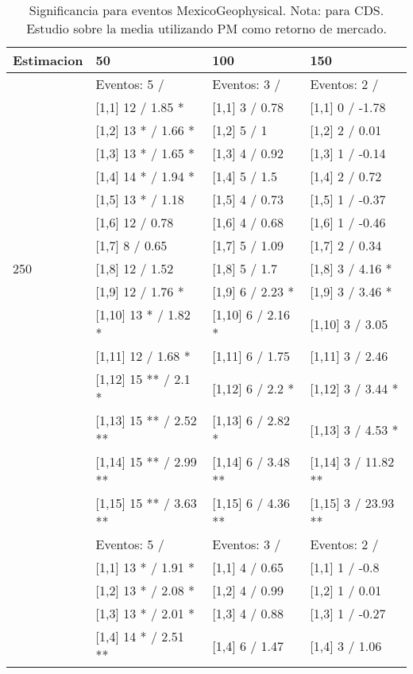 \begin{table}

\caption{Significancia para eventos MexicoGeophysical. Nota: para CDS. Estudio sobre la media utilizando PM como retorno de mercado.}
\centering
\begin{tabular}[t]{llll}
\toprule
Estimacion & 50 & 100 & 150\\
\midrule
 & Eventos:  5 / & Eventos:  3 / & Eventos:  2 /\\
 & {}[1,1] 12  / 1.85 * & {}[1,1] 3  / 0.78 & {}[1,1] 0  / -1.78\\
 & {}[1,2] 13 * / 1.66 * & {}[1,2] 5  / 1 & {}[1,2] 2  / 0.01\\
 & {}[1,3] 13 * / 1.65 * & {}[1,3] 4  / 0.92 & {}[1,3] 1  / -0.14\\
 & {}[1,4] 14 * / 1.94 * & {}[1,4] 5  / 1.5 & {}[1,4] 2  / 0.72\\
\addlinespace
 & {}[1,5] 13 * / 1.18 & {}[1,5] 4  / 0.73 & {}[1,5] 1  / -0.37\\
 & {}[1,6] 12  / 0.78 & {}[1,6] 4  / 0.68 & {}[1,6] 1  / -0.46\\
 & {}[1,7] 8  / 0.65 & {}[1,7] 5  / 1.09 & {}[1,7] 2  / 0.34\\
250 & {}[1,8] 12  / 1.52 & {}[1,8] 5  / 1.7 & {}[1,8] 3  / 4.16 *\\
 & {}[1,9] 12  / 1.76 * & {}[1,9] 6  / 2.23 * & {}[1,9] 3  / 3.46 *\\
\addlinespace
 & {}[1,10] 13 * / 1.82 * & {}[1,10] 6  / 2.16 * & {}[1,10] 3  / 3.05\\
 & {}[1,11] 12  / 1.68 * & {}[1,11] 6  / 1.75 & {}[1,11] 3  / 2.46\\
 & {}[1,12] 15 ** / 2.1 * & {}[1,12] 6  / 2.2 * & {}[1,12] 3  / 3.44 *\\
 & {}[1,13] 15 ** / 2.52 ** & {}[1,13] 6  / 2.82 * & {}[1,13] 3  / 4.53 *\\
 & {}[1,14] 15 ** / 2.99 ** & {}[1,14] 6  / 3.48 ** & {}[1,14] 3  / 11.82 **\\
\addlinespace
 & {}[1,15] 15 ** / 3.63 ** & {}[1,15] 6  / 4.36 ** & {}[1,15] 3  / 23.93 **\\
 & Eventos:  5 / & Eventos:  3 / & Eventos:  2 /\\
 & {}[1,1] 13 * / 1.91 * & {}[1,1] 4  / 0.65 & {}[1,1] 1  / -0.8\\
 & {}[1,2] 13 * / 2.08 * & {}[1,2] 4  / 0.99 & {}[1,2] 1  / 0.01\\
 & {}[1,3] 13 * / 2.01 * & {}[1,3] 4  / 0.88 & {}[1,3] 1  / -0.27\\
\addlinespace
 & {}[1,4] 14 * / 2.51 ** & {}[1,4] 6  / 1.47 & {}[1,4] 3  / 1.06\\

\end{tabular}
\end{table}
